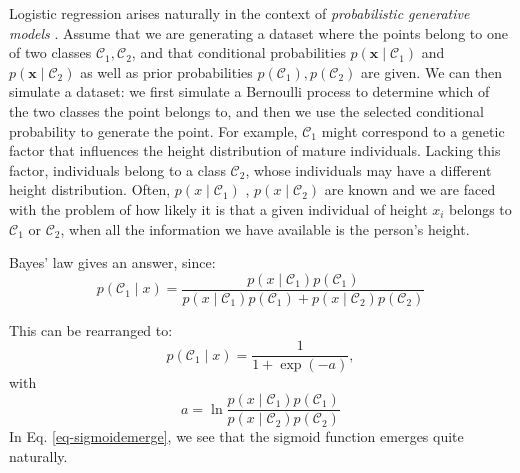   Logistic regression arises naturally in the context of  \emph{probabilistic generative models} \citet{bishop2006}. Assume that we are generating a dataset
  where the points belong to one of two classes $\mathcal{C}_1, \mathcal{C}_2$, and that conditional probabilities $p(\boldsymbol{x} \mid \mathcal{C}_1)$ and
  $p( \boldsymbol{x} \mid \mathcal{C}_2)$  as well as  prior probabilities $p(\mathcal{C}_1), p(\mathcal{C}_2)$ are given. We can then  simulate a dataset:
  we first simulate a Bernoulli process to determine which of the two classes the point belongs to, and then we use the selected conditional probability
  to generate the point. For example, $\mathcal{C}_1$ might correspond to a genetic factor that influences the height distribution of mature individuals. Lacking this
  factor, individuals belong to a class $\mathcal{C}_2$, whose individuals may have a different height distribution.
  Often, $p(x\mid \mathcal{C}_1)$ , $p(x \mid \mathcal{C}_2)$ are known and we are faced with the problem of how likely it is that a given individual of height
  $x_i$ belongs to $\mathcal{C}_1$ or $\mathcal{C}_2$, when all the information we have available is the person's height. 

  Bayes' law gives an answer, since:
  \begin{equation}
    p(\mathcal{C}_1 \mid x) = \frac{p(x \mid \mathcal{C}_1) p(\mathcal{C}_1)}{p(x \mid \mathcal{C}_1) p(\mathcal{C}_1)+ p(x \mid \mathcal{C}_2) p(\mathcal{C}_2)}
  \end{equation}

  This can be rearranged to:
\begin{equation}
  p(\mathcal{C}_1 \mid x) = \frac{1}{1 + \exp(-a)},
  \label{eq-sigmoidemerge}
\end{equation}
with
\begin{equation}
  a = \ln \frac{p(x \mid \mathcal{C}_1) p(\mathcal{C}_1)}{p(x \mid \mathcal{C}_2) p(\mathcal{C}_2)}
  \label{eq-a}
\end{equation}
In Eq. \ref{eq-sigmoidemerge}, we see that the sigmoid function emerges quite naturally.



